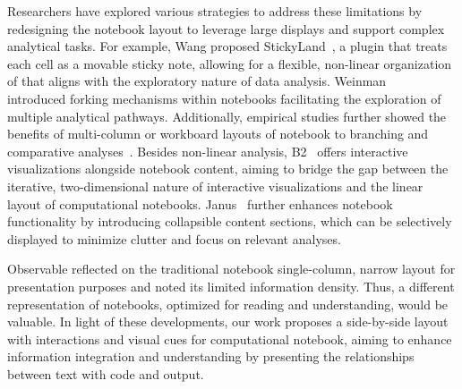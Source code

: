 Researchers have explored various strategies to address these limitations by redesigning the notebook layout to leverage large displays and support complex analytical tasks.
For example, Wang \etal proposed StickyLand~\cite{wang2022stickyland}, a plugin that treats each cell as a movable sticky note, allowing for a flexible,
non-linear organization of  that aligns with the exploratory nature of data analysis. 
Weinman~\etal~\cite{weinman2021fork} introduced forking mechanisms within notebooks facilitating the exploration of multiple analytical pathways.
Additionally, empirical studies further showed the benefits of multi-column or workboard layouts of notebook to branching and comparative analyses~\cite{harden2022exploring, harden2023there}.
Besides non-linear analysis, B2~\cite{wu2020b2} offers interactive visualizations alongside notebook content, aiming to bridge the gap between the iterative, two-dimensional nature of interactive visualizations and the linear layout of computational notebooks. 
Janus~\cite{rule2018aiding} further enhances notebook functionality by introducing collapsible content sections, which can be selectively displayed to minimize clutter and focus on relevant analyses. 




Observable reflected on the traditional notebook single-column, narrow layout for presentation purposes and noted its limited information density.
Thus, a different representation of notebooks, optimized for reading and understanding, would be valuable.
In light of these developments, our work proposes a side-by-side layout with interactions and visual cues for computational notebook, aiming to enhance information integration and understanding by presenting the relationships between text with code and output.


